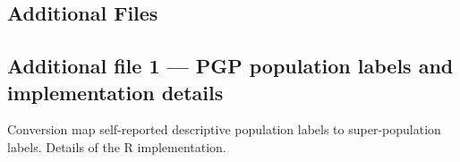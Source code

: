 \documentclass{bmcart}
\begin{document}
\begin{backmatter}

\section*{Additional Files}
  \subsection*{Additional file 1 --- PGP population labels and implementation details}
    Conversion map self-reported descriptive population labels to super-population labels. 
    Details of the R implementation.



\end{backmatter}
\end{document}
